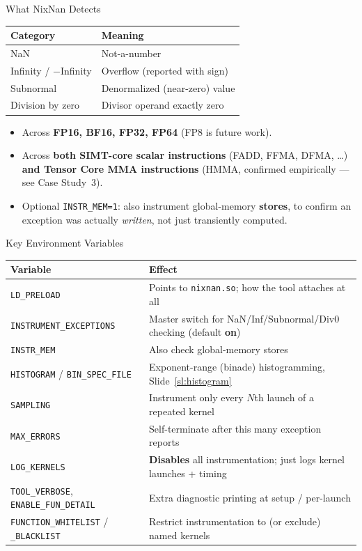 \documentclass[aspectratio=169,11pt]{beamer}
\begin{document}
\begin{frame}{What NixNan Detects}
\begin{center}
\begin{tabular}{ll}
\toprule
Category & Meaning \\
\midrule
NaN & Not-a-number \\
Infinity / $-$Infinity & Overflow (reported with sign) \\
Subnormal & Denormalized (near-zero) value \\
Division by zero & Divisor operand exactly zero \\
\bottomrule
\end{tabular}
\end{center}
\begin{itemize}
  \item Across \textbf{FP16, BF16, FP32, FP64} (FP8 is future work).
  \item Across \textbf{both SIMT-core scalar instructions} (FADD, FFMA, DFMA, \ldots)
    \textbf{and Tensor Core MMA instructions} (HMMA, confirmed empirically ---
    see Case Study~3).
  \item Optional \texttt{INSTR\_MEM=1}: also instrument global-memory
    \textbf{stores}, to confirm an exception was actually \emph{written},
    not just transiently computed.
\end{itemize}
\end{frame}

\begin{frame}{Key Environment Variables}
\scriptsize
\begin{center}
\begin{tabular}{lp{8cm}}
\toprule
Variable & Effect \\
\midrule
\texttt{LD\_PRELOAD} & Points to \texttt{nixnan.so}; how the tool attaches at all \\
\texttt{INSTRUMENT\_EXCEPTIONS} & Master switch for NaN/Inf/Subnormal/Div0 checking (default \textbf{on}) \\
\texttt{INSTR\_MEM} & Also check global-memory stores \\
\texttt{HISTOGRAM} / \texttt{BIN\_SPEC\_FILE} & Exponent-range (binade) histogramming, Slide~\ref{sl:histogram} \\
\texttt{SAMPLING} & Instrument only every $N$th launch of a repeated kernel \\
\texttt{MAX\_ERRORS} & Self-terminate after this many exception reports \\
\texttt{LOG\_KERNELS} & \textbf{Disables} all instrumentation; just logs kernel launches + timing \\
\texttt{TOOL\_VERBOSE}, \texttt{ENABLE\_FUN\_DETAIL} & Extra diagnostic printing at setup / per-launch \\
\texttt{FUNCTION\_WHITELIST} / \texttt{\_BLACKLIST} & Restrict instrumentation to (or exclude) named kernels \\
\bottomrule
\end{tabular}
\end{center}
\end{frame}
\end{document}
